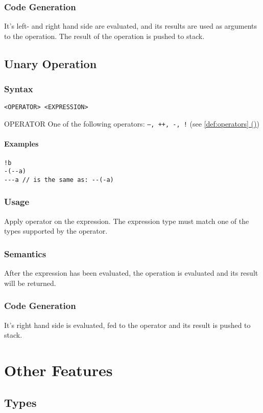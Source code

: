 \documentclass[twoside]{report}
\newcommand*{\fullref}[1]{\hyperref[{#1}]{\ref*{#1} (\nameref*{#1})}}
\newenvironment{mycompactdesc}{\begin{adjustwidth}{0.53cm}{}\begin{compactdesc}}{\end{compactdesc}\end{adjustwidth}}
\begin{document}
\subsubsection*{Code Generation}
It's left- and right hand side are evaluated, and its results are used as arguments to the operation. The result of the operation is pushed to stack.


\subsection{Unary Operation}
\label{def:unary_operation}
\subsubsection*{Syntax}
\texttt{<OPERATOR> <EXPRESSION>}
\begin{mycompactdesc}
	\item[OPERATOR] One of the following operators: \texttt{--, ++, -, !} (see \fullref{def:operators})
\end{mycompactdesc}
\paragraph{Examples}
\begin{verbatim}
!b
-(--a)
---a // is the same as: --(-a)
\end{verbatim}
\subsubsection*{Usage}
Apply operator on the expression. The expression type must match one of the types supported by the operator.
\subsubsection*{Semantics}
After the expression has been evaluated, the operation is evaluated and its result will be returned.
\subsubsection*{Code Generation}
It's right hand side is evaluated, fed to the operator and its result is pushed to stack.


\section{Other Features}
\label{def:other_features}


\subsection{Types}
\label{def:types}
\end{document}

